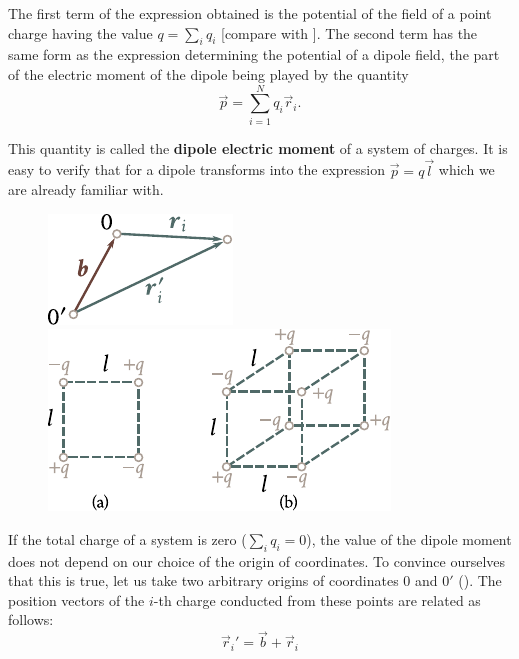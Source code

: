 \noindent
The first term of the expression obtained is the potential of the field of a point charge having the value $q=\sum_iq_i$ [compare with ]. The second term has the same form as the expression determining the potential of a dipole field, the part of the electric moment of the dipole being played by the quantity
\begin{equation}\label{eq:1_66}
	\vec{p} = \sum_{i=1}^N q_i \vec{r}_i.
\end{equation}

\noindent
This quantity is called the \textbf{dipole electric moment} of a system of charges. It is easy to verify that for a dipole  transforms
into the expression $\vec{p}=q\vec{l}$ which we are already familiar with.

\begin{figure}[t]
	\begin{minipage}[t]{0.4\linewidth}
		\begin{center}
			\includegraphics[scale=1]{figures/ch_01/fig_1_17.pdf}
			\caption[]{}
			\label{fig:1_17}
		\end{center}
	\end{minipage}
	\hspace{-0.05cm}
	\begin{minipage}[t]{0.6\linewidth}
		\begin{center}
			\includegraphics[scale=1]{figures/ch_01/fig_1_18.pdf}
			\caption[]{}
			\label{fig:1_18}
		\end{center}
	\end{minipage}
\vspace{-0.4cm}
\end{figure}

If the total charge of a system is zero ($\sum_iq_i=0$), the value of the dipole moment does not depend on our choice of the origin of coordinates. To convince ourselves that this is true, let us take two arbitrary origins of coordinates $0$ and $0'$ (). The position vectors of the $i$-th charge conducted from these points are related as follows:
\begin{equation}\label{eq:1_67}
	\vec{r}_i' = \vec{b} + \vec{r}_i
\end{equation}

